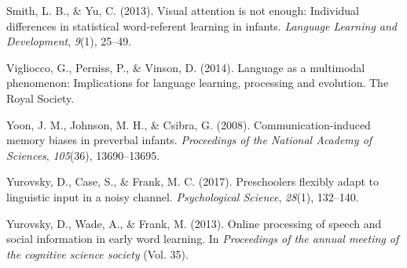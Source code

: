 \documentclass[10pt, letterpaper]{article}
\begin{document}
\leavevmode\hypertarget{ref-smith2013visual}{}%
Smith, L. B., \& Yu, C. (2013). Visual attention is not enough:
Individual differences in statistical word-referent learning in infants.
\emph{Language Learning and Development}, \emph{9}(1), 25--49.

\leavevmode\hypertarget{ref-vigliocco2014language}{}%
Vigliocco, G., Perniss, P., \& Vinson, D. (2014). Language as a
multimodal phenomenon: Implications for language learning, processing
and evolution. The Royal Society.

\leavevmode\hypertarget{ref-yoon2008communication}{}%
Yoon, J. M., Johnson, M. H., \& Csibra, G. (2008). Communication-induced
memory biases in preverbal infants. \emph{Proceedings of the National
Academy of Sciences}, \emph{105}(36), 13690--13695.

\leavevmode\hypertarget{ref-yurovsky2017preschoolers}{}%
Yurovsky, D., Case, S., \& Frank, M. C. (2017). Preschoolers flexibly
adapt to linguistic input in a noisy channel. \emph{Psychological
Science}, \emph{28}(1), 132--140.

\leavevmode\hypertarget{ref-yurovsky2013online}{}%
Yurovsky, D., Wade, A., \& Frank, M. (2013). Online processing of speech
and social information in early word learning. In \emph{Proceedings of
the annual meeting of the cognitive science society} (Vol. 35).


\end{document}

